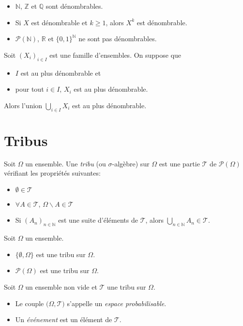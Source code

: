 \documentclass{yann}
\renewcommand{\T}{\mathscr{T}}
\newcommand{\Part}{\mathcal{P}}
\newcommand{\Pro}{\bigl(Ω,\T\bigr)}
\begin{document}
\begin{itemize}
\item
$ℕ$, $ℤ$ et $ℚ$ sont dénombrables.
\item
Si $X$ est dénombrable et $k≥1$, alors $X^k$ est dénombrable.
\item
$\mathcal{P}(ℕ)$, $ℝ$ et $\{0,1\}^ℕ$ ne sont pas dénombrables.
\end{itemize}


Soit $(X_i)_{i∈I}$ est une famille d'ensembles. On suppose que
\begin{itemize}
\item
$I$ est au plus dénombrable et
\item
pour tout $i∈I$, $X_i$ est au plus dénombrable.
\end{itemize}

Alors l'union $⋃_{i∈I} X_i$ est au plus dénombrable.

\section{Tribus}


Soit $Ω$ un ensemble.
Une \emph{tribu} (ou $σ$-algèbre) sur $Ω$ est une partie $\T$ de $\Part(Ω)$ vérifiant les propriétés suivantes:
\begin{itemize}
\item
$∅∈\T$
\item
$∀A ∈\T$, $Ω∖A ∈\T$
\item
Si $(A_n)_{n∈ℕ}$ est une suite d'éléments de $\T$, alors $⋃_{n∈ℕ} A_n∈\T$.
\end{itemize}


Soit $Ω$ un ensemble.
\begin{itemize}
\item
$\{ ∅, Ω\}$ est une tribu sur $Ω$.
\item
$\Part(Ω)$ est une tribu sur $Ω$.
\end{itemize}


Soit $Ω$ un ensemble non vide et $\T$ une tribu sur $Ω$.
\begin{itemize}
\item
Le couple $\Pro$ s'appelle un \emph{espace probabilisable}.
\item
Un \emph{événement} est un élément de $\T$.
\end{itemize}
\end{document}
